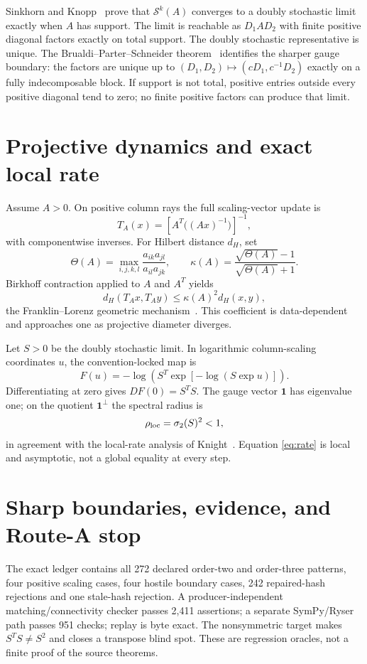 \documentclass[9pt]{extarticle}
\newcommand{\one}{\mathbf 1}
\begin{document}
Sinkhorn and Knopp~\cite{SK67} prove that $\mathcal S^k(A)$ converges to a
doubly stochastic limit exactly when $A$ has support.  The limit is reachable
as $D_1AD_2$ with finite positive diagonal factors exactly on total support.
The doubly stochastic representative is unique.  The
Brualdi--Parter--Schneider theorem~\cite{BPS66} identifies the sharper gauge
boundary: the factors are unique up to
$(D_1,D_2)\mapsto(cD_1,c^{-1}D_2)$ exactly on a fully indecomposable block.
If support is not total, positive entries outside every positive diagonal tend
to zero; no finite positive factors can produce that limit.

\section{Projective dynamics and exact local rate}
Assume $A>0$.  On positive column rays the full scaling-vector update is
\[
 T_A(x)=\left[A^T\bigl((Ax)^{-1}\bigr)\right]^{-1},
\]
with componentwise inverses.  For Hilbert distance $d_H$, set
\[
 \Theta(A)=\max_{i,j,k,l}\frac{a_{ik}a_{jl}}{a_{il}a_{jk}},\qquad
 \kappa(A)=\frac{\sqrt{\Theta(A)}-1}{\sqrt{\Theta(A)}+1}.
\]
Birkhoff contraction applied to $A$ and $A^T$ yields
\begin{equation}\label{eq:contraction}
 d_H(T_Ax,T_Ay)\le\kappa(A)^2d_H(x,y),
\end{equation}
the Franklin--Lorenz geometric mechanism~\cite{FL89}.  This coefficient is
data-dependent and approaches one as projective diameter diverges.

Let $S>0$ be the doubly stochastic limit.  In logarithmic column-scaling
coordinates $u$, the convention-locked map is
\[
 F(u)=-\log\!\left(S^T\exp[-\log(S\exp u)]\right).
\]
Differentiating at zero gives $DF(0)=S^TS$.  The gauge vector $\one$ has
eigenvalue one; on the quotient $\one^\perp$ the spectral radius is
\begin{equation}\label{eq:rate}
 \rho_{\rm loc}=\sigma_2(S)^2<1,
\end{equation}
in agreement with the local-rate analysis of Knight~\cite{K08}.  Equation
\eqref{eq:rate} is local and asymptotic, not a global equality at every step.

\section{Sharp boundaries, evidence, and Route-A stop}
The exact ledger contains all 272 declared order-two and order-three patterns,
four positive scaling cases, four hostile boundary cases, 242 repaired-hash
rejections and one stale-hash rejection.  A producer-independent
matching/connectivity checker passes 2,411 assertions; a separate SymPy/Ryser
path passes 951 checks; replay is byte exact.  The nonsymmetric target makes
$S^TS\ne S^2$ and closes a transpose blind spot.  These are regression oracles,
not a finite proof of the source theorems.
\end{document}
